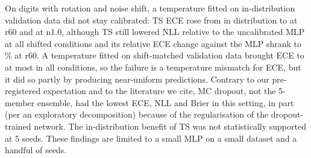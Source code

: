 On digits with rotation and noise shift, a temperature fitted on in-distribution validation data did not stay calibrated: TS ECE rose from  in distribution to  at r60 and  at n1.0, although TS still lowered NLL relative to the uncalibrated MLP at all shifted conditions and its relative ECE change against the MLP shrank to \% at r60. A temperature fitted on shift-matched validation data brought ECE to at most  in all conditions, so the failure is a temperature mismatch for ECE, but it did so partly by producing near-uniform predictions. Contrary to our pre-registered expectation and to the literature we cite, MC dropout, not the 5-member ensemble, had the lowest ECE, NLL and Brier in this setting, in part (per an exploratory decomposition) because of the regularisation of the dropout-trained network. The in-distribution benefit of TS was not statistically supported at 5 seeds. These findings are limited to a small MLP on a small dataset and a handful of seeds.
